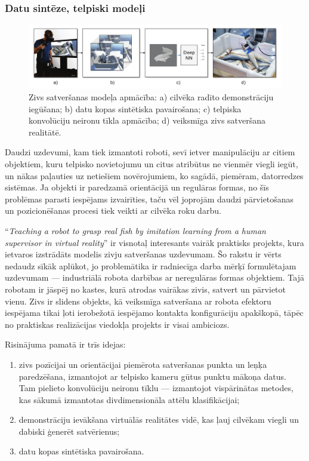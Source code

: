 \documentclass[12pt, a4paper]{article}
\numberwithin{equation}{section} %
\begin{document}
\subsubsection{Datu sintēze, telpiski modeļi}

\begin{figure}[t!]
    \centering
    \includegraphics[width=16cm]{../img/fish.png}
    \caption{Zivs satveršanas modeļa apmācība: a) cilvēka radīto demonstrāciju iegūšana; b) datu kopas sintētiska pavairošana; c) telpiska konvolūciju neironu tīkla apmācība; d) veiksmīga zivs satveršana realitātē. \cite{dyrstad2018teaching}}
\end{figure}

Daudzi uzdevumi, kam tiek izmantoti roboti, sevī ietver manipulāciju ar citiem objektiem, kuru telpisko novietojumu un citus atribūtus ne vienmēr viegli iegūt, un nākas paļauties uz netiešiem novērojumiem, ko sagādā, piemēram, datorredzes sistēmas. Ja objekti ir paredzamā orientācijā un regulāras formas, no šīs problēmas parasti iespējams izvairīties, taču vēl joprojām daudzi pārvietošanas un pozicionēšanas procesi tiek veikti ar cilvēka roku darbu.

``\textit{Teaching a robot to grasp real fish by imitation learning from a human supervisor in virtual reality}'' \cite{dyrstad2018teaching} ir visnotaļ interesants vairāk praktisks projekts, kura ietvaros izstrādāts modelis zivju satveršanas uzdevumam. Šo rakstu ir vērts nedaudz sīkāk aplūkot, jo problemātika ir radniecīga darba mērķī formulētajam uzdevumam --- industriālā robota darbības ar neregulāras formas objektiem. Tajā robotam ir jāspēj no kastes, kurā atrodas vairākas zivis, satvert un pārvietot vienu. Zivs ir slidens objekts, kā veiksmīga satveršana ar robota efektoru iespējama tikai ļoti ierobežotā iespējamo kontakta konfigurāciju apakškopā, tāpēc no praktiskas realizācijas viedokļa projekts ir visai ambiciozs. 

Risinājuma pamatā ir trīs idejas:

\begin{enumerate}
    \item zivs pozīcijai un orientācijai piemērota satveršanas punkta un leņķa paredzēšana, izmantojot ar telpisko kameru gūtus punktu mākoņa datus. Tam pielieto konvolūciju neironu tīklu --- izmantojot vispārinātas metodes, kas sākumā izmantotas divdimensionāla attēlu klasifikācijai;
    \item demonstrāciju ievākšana virtuālās realitātes vidē, kas ļauj cilvēkam viegli un dabiski ģenerēt satvērienus;
    \item datu kopas sintētiska pavairošana.
\end{enumerate}
\end{document}
